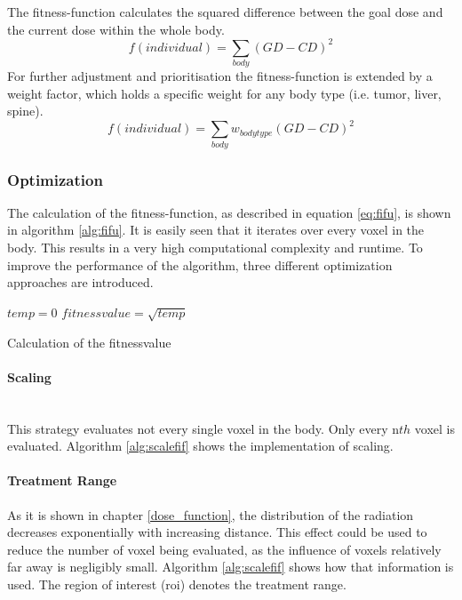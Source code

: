 \documentclass[12pt]{article}
\begin{document}
 The fitness-function calculates the squared difference between the goal dose and the current dose within the whole body.
 \begin{equation}
 f(individual) = \sum_{body}(GD-CD)^2
 \end{equation}
 For further adjustment and prioritisation the fitness-function is extended by a weight factor, which holds a specific weight for any body type (i.e. tumor, liver, spine).
 \begin{equation}
 \label{eq:fifu}
 f(individual) = \sum_{body}w_{bodytype}(GD-CD)^2
 \end{equation}

\subsubsection{Optimization}
\label{subsubsec:optimization}
The calculation of the fitness-function, as described in equation \eqref{eq:fifu}, is shown in algorithm \ref{alg:fifu}. It is easily seen that it iterates over every voxel in the body. This results in a very high computational complexity and runtime. To improve the performance of the algorithm, three different optimization approaches are introduced. \\

\begin{algorithm}[H]
\label{alg:fifu}
 $temp=0$\;
 $fitnessvalue = \sqrt{temp}$\;
 \;
 \caption{Calculation of the fitnessvalue}
 
 \end{algorithm}


\paragraph{Scaling}
\label{para:scaling}
~\\
This strategy evaluates not every single voxel in the body. Only every n$th$ voxel is evaluated. Algorithm \ref{alg:scalefif} shows the implementation of scaling. \\

\paragraph{Treatment Range}
\label{para:treatment range}
As it is shown in chapter \ref{dose_function}, the distribution of the radiation decreases exponentially with increasing distance. This effect could be used to reduce the number of voxel being evaluated, as the influence of voxels relatively far away is negligibly small. Algorithm \ref{alg:scalefif} shows how that information is used. The region of interest (roi) denotes the treatment range. \\
\end{document}
